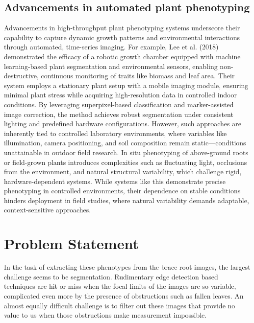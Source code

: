 \subsection{Advancements in automated plant phenotyping}
Advancements in high-throughput plant phenotyping systems underscore their capability to capture dynamic growth patterns and environmental interactions through automated, time-series imaging. For example, Lee et al. (2018) demonstrated the efficacy of a robotic growth chamber equipped with machine learning-based plant segmentation and environmental sensors, enabling non-destructive, continuous monitoring of traits like biomass and leaf area. Their system employs a stationary plant setup with a mobile imaging module, ensuring minimal plant stress while acquiring high-resolution data in controlled indoor conditions. By leveraging superpixel-based classification and marker-assisted image correction, the method achieves robust segmentation under consistent lighting and predefined hardware configurations.\cite{Lee2018} However, such approaches are inherently tied to controlled laboratory environments, where variables like illumination, camera positioning, and soil composition remain static—conditions unattainable in outdoor field research. In situ phenotyping of above-ground roots or field-grown plants introduces complexities such as fluctuating light, occlusions from the environment, and natural structural variability, which challenge rigid, hardware-dependent systems. While systems like this demonstrate precise phenotyping in controlled environments, their dependence on stable conditions hinders deployment in field studies, where natural variability demands adaptable, context-sensitive approaches.


\section{Problem Statement}
In the task of extracting these phenotypes from the brace root images, the largest challenge seems to be segmentation. Rudimentary edge detection based techniques are hit or miss when the focal limits of the images are so variable, complicated even more by the presence of obstructions such as fallen leaves. An almost equally difficult challenge is to filter out these images that provide no value to us when those obstructions make measurement impossible. 

